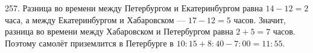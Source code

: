 257. Разница во времени между Петербургом и Екатеринбургом равна $14-12=2$ часа, а между Екатеринбургом и Хабаровском --- $17-12=5$ часов. Значит, разница во времени между Хабаровском и Петербургом равна $2+5=7$ часов. Поэтому самолёт приземлится в Петербурге в $10:15+8:40-7:00=11:55.$\\
